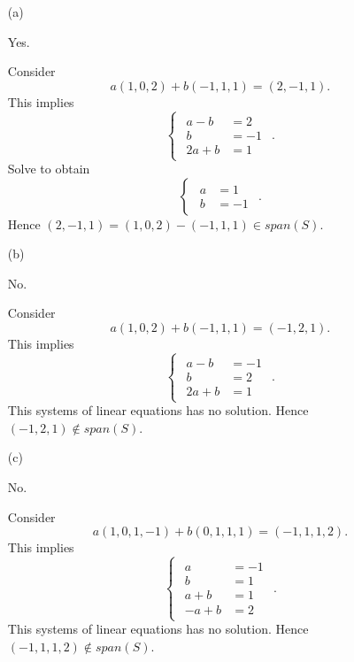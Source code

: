 \begin{Exercise}
\begin{enumerate}[(a)]
\item[(a)]
\begin{answer}
Yes.
\end{answer}
\begin{solution}
Consider
$$
a(1,0,2)+b(-1,1,1) = (2,-1,1).
$$
This implies
$$
\begin{cases}
\begin{aligned}
a-b &= 2 \\
b &= -1 \\
2a+b &= 1
\end{aligned}
\end{cases}.
$$
Solve to obtain
$$
\begin{cases}
\begin{aligned}
a &= 1 \\
b &= -1
\end{aligned}
\end{cases}.
$$
Hence $(2,-1,1) = (1,0,2)-(-1,1,1) \in span(S)$.
\end{solution}

\item[(b)]
\begin{answer}
No.
\end{answer}
\begin{solution}
Consider
$$
a(1,0,2)+b(-1,1,1) = (-1,2,1).
$$
This implies
$$
\begin{cases}
\begin{aligned}
a-b &= -1 \\
b &= 2 \\
2a+b &= 1
\end{aligned}
\end{cases}.
$$
This systems of linear equations has no solution. Hence $(-1,2,1)\notin span(S)$.
\end{solution}

\item[(c)]
\begin{answer}
No.
\end{answer}
\begin{solution}
Consider
$$
a(1,0,1,-1)+b(0,1,1,1) = (-1,1,1,2).
$$
This implies
$$
\begin{cases}
\begin{aligned}
a &= -1 \\
b &= 1 \\
a+b &= 1 \\
-a+b &= 2
\end{aligned}
\end{cases}.
$$
This systems of linear equations has no solution. Hence $(-1,1,1,2)\notin span(S)$.
\end{solution}


\end{enumerate}
\end{Exercise}

